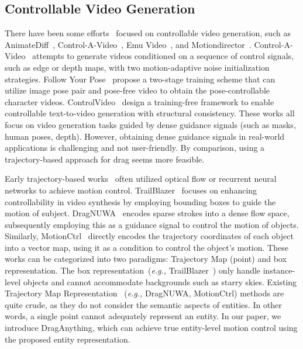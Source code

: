 \documentclass[runningheads]{llncs}
\def\eg{\emph{e.g.,}}
\newcommand{\ours}{\textup{DragAnything}\xspace}
\begin{document}
\subsection{Controllable Video Generation}
There have been some efforts~\cite{zhang2023controlvideo,ma2023follow,chen2023motion,guo2023sparsectrl,ma2023trailblazer,zhang2024moonshot} focused on controllable video generation, such as AnimateDiff~\cite{guo2023animatediff}, Control-A-Video~\cite{chen2023control}, Emu Video~\cite{girdhar2023emu}, and Motiondirector~\cite{zhao2023motiondirector}.
%
Control-A-Video~\cite{chen2023control} attempts to generate videos conditioned on a sequence of control signals, such as edge or depth maps, with two motion-adaptive noise initialization strategies.
%
Follow Your Pose~\cite{ma2023follow} propose a two-stage training
scheme that can utilize image pose pair and pose-free video to obtain the pose-controllable character videos. 
%
ControlVideo~\cite{zhang2023controlvideo} design a training-free framework to enable controllable text-to-video generation with structural consistency.
%
These works all focus on video generation tasks guided by dense guidance signals (such as masks, human poses, depth).
%
However, obtaining dense guidance signals in real-world applications is challenging and not user-friendly.
%
By comparison, using a trajectory-based approach for drag seems more feasible.

Early trajectory-based works~\cite{hao2018controllable,ardino2021click,blattmann2021ipoke,blattmann2021understanding} often utilized optical flow or recurrent neural networks to achieve motion control.
%
TrailBlazer~\cite{ma2023trailblazer} focuses on enhancing controllability in video synthesis by employing bounding boxes to guide the motion of subject.
DragNUWA~\cite{yin2023dragnuwa} encodes sparse strokes into a dense flow space, subsequently employing this as a guidance signal to control the motion of objects.
Similarly, MotionCtrl~\cite{wang2023motionctrl} directly encodes the trajectory coordinates of each object into a vector map, using it as a condition to control the object's motion.
%
These works can be categorized into two paradigms: Trajectory Map (point) and box representation.
%
The box representation~(\eg{} TrailBlazer~\cite{ma2023trailblazer}) only handle instance-level objects and cannot accommodate backgrounds such as starry skies. 
%
Existing Trajectory Map Representation ~(\eg{} DragNUWA, MotionCtrl) methods are quite crude, as they do not consider the semantic aspects of entities.
%
In other words, a single point cannot adequately represent an entity.
%
In our paper, we introduce \ours, which can achieve true entity-level motion control using the proposed entity representation.
\end{document}
